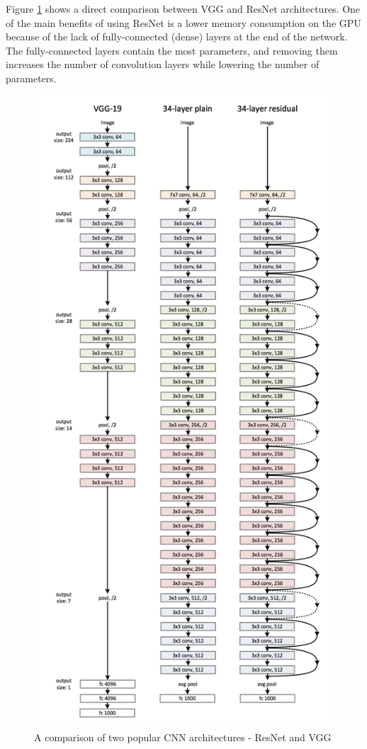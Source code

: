 \documentclass[times, utf8, diplomski]{fer}
\begin{document}
Figure \ref{fig:vgg_resnet_comparison} shows a direct comparison between VGG \citep{simonyan_very_2014} and ResNet architectures. One of the main benefits of using ResNet is a lower memory consumption on the GPU because of the lack of fully-connected (dense) layers at the end of the network. The fully-connected layers contain the most parameters, and removing them increases the number of convolution layers while lowering the number of parameters.

\begin{figure}
  \includegraphics[scale=0.7]{figures/resnet_vgg_comparison.png}
  \centering
  \caption{A comparison of two popular CNN architectures - ResNet and VGG}
  \label{fig:vgg_resnet_comparison}
\end{figure}
\end{document}
